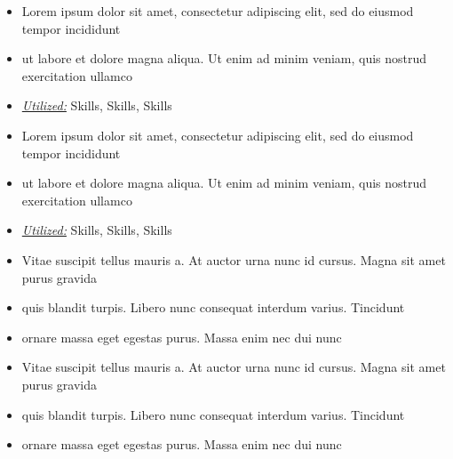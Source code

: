 \documentclass[10pt,a4paper,ragged2e]{altacv}
\begin{document}
\begin{itemize}
  \item Lorem ipsum dolor sit amet, consectetur adipiscing elit, sed do eiusmod tempor incididunt
  \item ut labore et dolore magna aliqua. Ut enim ad minim veniam, quis nostrud exercitation ullamco
  \item \underline{\textit{Utilized:}} Skills, Skills, Skills
\end{itemize}
\divider\small

\begin{itemize}
  \item Lorem ipsum dolor sit amet, consectetur adipiscing elit, sed do eiusmod tempor incididunt
  \item ut labore et dolore magna aliqua. Ut enim ad minim veniam, quis nostrud exercitation ullamco
  \item \underline{\textit{Utilized:}} Skills, Skills, Skills
\end{itemize}
\divider\small


\begin{itemize}
\item Vitae suscipit tellus mauris a. At auctor urna nunc id cursus. Magna sit amet purus gravida
\item quis blandit turpis. Libero nunc consequat interdum varius. Tincidunt
\item ornare massa eget egestas purus. Massa enim nec dui nunc
\end{itemize}
\divider\small

\begin{itemize}
\item Vitae suscipit tellus mauris a. At auctor urna nunc id cursus. Magna sit amet purus gravida
\item quis blandit turpis. Libero nunc consequat interdum varius. Tincidunt
\item ornare massa eget egestas purus. Massa enim nec dui nunc
\end{itemize}
\divider\small
\end{document}
